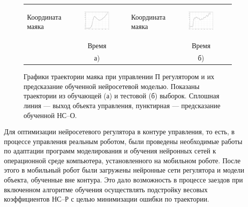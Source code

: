 \begin{figure}
\centering
\begin{tabular}{lclc}
  \begin{sideways}
    {\hspace{1.7cm}\small Координата маяка}
  \end{sideways}
  &
  \includegraphics[width=0.45\textwidth,%
    totalheight=0.25\textheight]{moby_nnp_learn_no_title}
  &
  \begin{sideways}
    {\hspace{1.7cm}\small Координата маяка}
  \end{sideways}
  &
  \includegraphics[width=0.45\textwidth,%
    totalheight=0.25\textheight]{moby_nnp_test_no_title}
  \\
  & {\small Время} & & {\small Время}\\
  & а) & & б)\\
\end{tabular}
\caption{Графики траектории маяка при управлении П регулятором и их
предсказание обученной нейросетевой моделью.  Показаны траектории
из обучающей (а) и тестовой (б) выборок.  Сплошная линия --- выход объекта
управления, пунктирная --- предсказание обученной НС--О.}
\label{fig:moby_nnp}
\end{figure}


Для оптимизации нейросетевого регулятора в контуре управления, то
есть, в процессе управления реальным роботом, были проведены
необходимые работы по адаптации программ моделирования и обучения
нейронных сетей к операционной среде компьютера, установленного на
мобильном роботе.  После этого в мобильный робот были загружены
нейронные сети регулятора и модели объекта, обученные вне контура.
Это дало возможность в процессе заездов при включенном алгоритме
обучения осуществлять подстройку весовых коэффициентов НС--Р с целью
минимизации ошибки по траектории.

